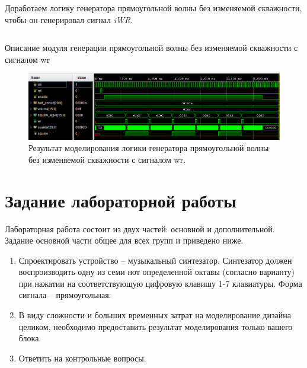 Доработаем логику генератора прямоугольной волны без изменяемой скважности, чтобы он генерировал сигнал \textit{iWR}.


% 	

\begin{longlisting}
	\inputminted{SystemVerilog}{code_examples/lab_7/square_code_wr.sv}
	\caption{Описание модуля генерации прямоугольной волны без изменяемой скважности с сигналом wr}
\end{longlisting}


\begin{figure}[H]
	\centering
	\includegraphics [width=1\textwidth] {images/lab_7/square_simulate3.png}
	\caption{Результат моделирования логики генератора прямоугольной волны без изменяемой скважности с сигналом wr.}
	\label{lab7:pic7}
\end{figure}

\section{Задание лабораторной работы}

Лабораторная работа состоит из двух частей: основной и дополнительной. Задание основной части общее для всех групп и приведено ниже.

\begin{enumerate}
	\item Спроектировать устройство -- музыкальный синтезатор. Синтезатор должен воспроизводить одну из семи нот определенной октавы (согласно варианту) при нажатии на соответствующую цифровую клавишу 1-7 клавиатуры. Форма сигнала -- прямоугольная.
	\item В виду сложности и больших временных затрат на моделирование дизайна целиком, необходимо предоставить результат моделирования только вашего блока.
	\item Ответить на контрольные вопросы.
\end{enumerate}



